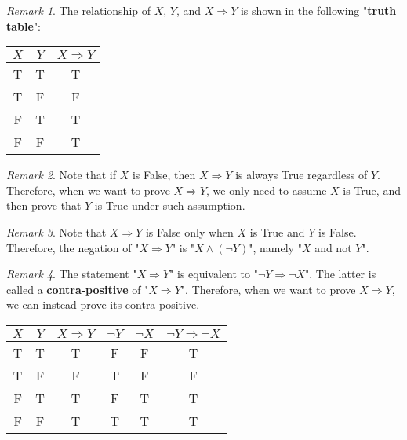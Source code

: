 \documentclass{book}
\theoremstyle{remark}
\newtheorem{remark}{Remark}[section]
\theoremstyle{definition}
\begin{document}
\begin{remark} The relationship of $X$, $Y$, and $X \Rightarrow Y$ is shown in the following "\textbf{truth table}":
    \begin{center}
    \begin{tabular}{c|c|c}
         $X$ & $Y$ & $X \Rightarrow Y$  \\
         \hline
         T & T & T \\
         T & F & F \\
         F & T & T \\
         F & F & T
    \end{tabular}
    \end{center}
\end{remark}

\begin{remark}
    Note that if $X$ is False, then $X \Rightarrow Y$ is always True regardless of $Y$. Therefore, when we want to prove $X \Rightarrow Y$, we only need to assume $X$ is True, and then prove that $Y$ is True under such assumption.\\
\end{remark}

\begin{remark}
    Note that $X \Rightarrow Y$ is False only when $X$ is True and $Y$ is False. Therefore, the negation of "$X \Rightarrow Y$" is "$X \wedge (\neg Y)$", namely "$X$ and not $Y$".\\
\end{remark}
    
\begin{remark}
    The statement "$X \Rightarrow Y$" is equivalent to "$\neg Y \Rightarrow \neg X$". The latter is called a \textbf{contra-positive} of "$X \Rightarrow Y$". Therefore, when we want to prove $X \Rightarrow Y$, we can instead prove its contra-positive.
    \begin{center}
    \begin{tabular}{c|c|c|c|c|c}
         $X$ & $Y$ & $X \Rightarrow Y$ & $\neg Y$ & $\neg X$ & $\neg Y \Rightarrow \neg X$ \\
         \hline
         T & T & T & F & F & T\\
         T & F & F & T & F & F\\
         F & T & T & F & T & T\\
         F & F & T & T & T & T
    \end{tabular}
    \end{center}
\end{remark}
\end{document}
